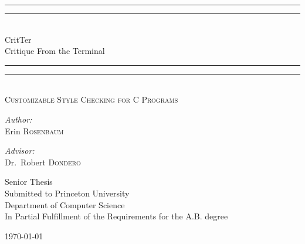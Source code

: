 \begin{titlepage}

\begin{center}

\rule{\linewidth}{1.6pt}\vspace*{-\baselineskip}\vspace*{2pt}
\rule{\linewidth}{0.4pt}\\[\baselineskip]
{\huge CritTer \\[0.5\baselineskip] Critique From the Terminal}\\[0.2\baselineskip]
\rule{\linewidth}{0.4pt}\vspace*{-\baselineskip}\vspace{3.2pt}
\rule{\linewidth}{1.6pt}\\[\baselineskip]
\scshape
\Large Customizable Style Checking for C Programs \par
\vspace*{4\baselineskip}

\begin{minipage}{0.4\textwidth}
\begin{flushleft} \large
\emph{Author:}\\
Erin \textsc{Rosenbaum}
\end{flushleft}
\end{minipage}
\begin{minipage}{0.4\textwidth}
\begin{flushright} \large
\emph{Advisor:} \\
Dr.~Robert \textsc{Dondero}
\end{flushright}
\end{minipage}

\vspace{5cm}
\small{
Senior Thesis \\[0.4cm]
Submitted to Princeton University \\
Department of Computer Science\\
In Partial Fulfillment of the Requirements for the A.B. degree \\
}

\vfill

{\large \today}

\end{center}

\end{titlepage}
